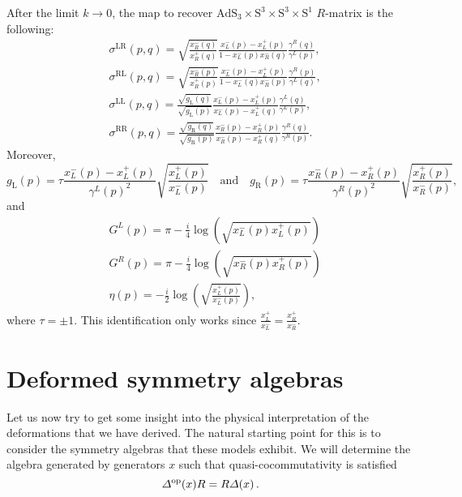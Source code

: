 \documentclass[12pt,a4paper]{article}
\numberwithin{equation}{section}
\begin{document}
After the limit $ k\rightarrow 0 $, the map to recover $\mathrm{AdS}_3\times \mathrm{S}^3\times \mathrm{S}^3\times \mathrm{S}^1$ $ R $-matrix is the following:
%
\begin{align}
&\sigma^{\text{LR}}(p,q)=\sqrt{\frac{x_R^-(q)}{x_R^+(q)}}\frac{x_L^-(p)-x_L^+(p)}{1-x_L^-(p)x_R^-(q)}\frac{\gamma^R(q)}{\gamma^L(p)},\\
&\sigma^{\text{RL}}(p,q)=\sqrt{\frac{x_R^-(p)}{x_R^+(p)}}\frac{x_L^-(p)-x_L^+(p)}{1-x_L^-(q)x_R^-(p)}\frac{\gamma^R(p)}{\gamma^L(q)},\\
&\sigma^{\text{LL}}(p,q)=\frac{\sqrt{g_\text{L}(q)}}{\sqrt{g_\text{L}(p)}}\frac{x_L^-(p)-x_L^+(p)}{x_L^-(p)-x_L^+(q)}\frac{\gamma^L(q)}{\gamma^L(p)},\\
&\sigma^{\text{RR}}(p,q)=\frac{\sqrt{g_\text{R}(q)}}{\sqrt{g_\text{R}(p)}}\frac{x_R^-(p)-x_R^+(p)}{x_R^-(p)-x_R^+(q)}\frac{\gamma^R(q)}{\gamma^R(p)}.
\end{align}
 Moreover,
%
\begin{equation}
g_{\text{L}}(p)=\tau \frac{x_L^-(p)-x_L^+(p)}{\gamma^L(p)^2}\sqrt{\frac{x_L^+(p)}{x_L^-(p)}} \quad \text{and}\quad  g_{\text{R}}(p)=\tau\frac{x_R^-(p)-x_R^+(p)}{\gamma^R(p)^2}\sqrt{\frac{x_R^+(p)}{x_R^-(p)}} ,
\end{equation}
and
%
\begin{align}
& G^L(p)=\pi -\frac{i}{4}\log\left(\sqrt{x_L^-(p)x_L^+(p)}\right) \\
& G^R(p)=\pi -\frac{i}{4}\log\left(\sqrt{x_R^-(p)x_R^+(p)}\right) \\
& \eta(p)= -\frac{i}{2} \log\left(\sqrt{\frac{x_L^+(p)}{x_L^-(p)}}\right),
\end{align}
where $ \tau=\pm 1 $. This identification only works since $\frac{x_L^+}{x_L^-}= \frac{x_R^+}{x_R^-}$. 

 
\section{Deformed symmetry algebras}\label{symmetryalgs}

Let us now try to get some insight into the physical interpretation of the deformations that we have derived. The natural starting point for this is to consider the symmetry algebras that these models exhibit. We will determine the algebra generated by generators $x$ such that quasi-cocommutativity is satisfied
\begin{equation}\label{opcoop}
\Delta^{\rm op}(x)R = R \Delta(x)\,.
\end{equation}
\end{document}
